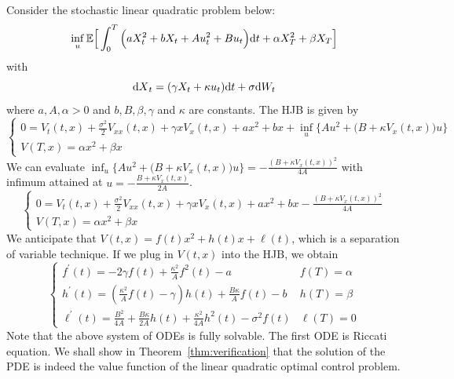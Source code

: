 \documentclass[11pt]{book}
\newcommand{\dt}{\text{\normalfont d}t}
\newcommand{\dX}{\text{\normalfont d}X}
\newcommand{\dW}{\text{\normalfont d}W}
\begin{document}
\begin{eg}\label{eg:LQ_drift}
    Consider the stochastic linear quadratic problem below:
    \begin{equation}
        \inf_u\mathbb{E}\Big[\int_0^T \Big(aX_t^2+bX_t +Au_t^2 + Bu_t\Big){\dt}+\alpha X_T^2+\beta X_T\Big]
    \end{equation}
    with
    \begin{equation}
        {\dX}_t=(\gamma X_t+\kappa u_t){\dt}+\sigma \dW_t
    \end{equation}
where $a,A, \alpha>0$ and $b,B,\beta,\gamma$ and $\kappa$ are constants. The HJB is given by 
\begin{equation}
    \begin{cases}
        0={V}_{t}(t,x) +\frac{\sigma^2}{2}V_{xx}(t,x)+ \gamma x V_{x}(t,x) + a x^2 + bx +\inf_{u}\Big\{Au^2 +\big(B+\kappa V_{x}(t,x)\big)u \Big\}\\
        V(T,x)=\alpha x^2 + \beta x
    \end{cases}
\end{equation}
We can evaluate
$\inf_u\{Au^2 +\big(B+\kappa V_{x}(t,x)\big)u\} = -\frac{(B+\kappa V_{x}(t,x))^2}{4A}$ with infimum attained at $u =-\frac{B+\kappa V_{x}(t,x)}{2A}$.
\begin{equation}
    \begin{cases}
        0={V}_{t}(t,x) +\frac{\sigma^2}{2}V_{xx}(t,x)+ \gamma x V_{x}(t,x) + a x^2 + bx -\frac{(B+\kappa V_{x}(t,x))^2}{4A}\\
        V(T,x)=\alpha x^2 + \beta x
    \end{cases}
\end{equation}
We anticipate that $V(t,x)=f(t)x^2+h(t)x+\ell(t)$, which is a separation of variable technique. If we plug in $V(t,x)$  into the HJB, we obtain
\begin{equation}
    \begin{cases}
       f^\prime(t) = -2\gamma f(t) + \frac{\kappa^2}{A}f^{2}(t) -a& f(T)=\alpha\\
       h^{\prime}(t)= (\frac{\kappa^2}{A}f(t)-\gamma)h(t)+\frac{B\kappa}{A}f(t)-b& h(T)=\beta\\
       \ell^{\prime}(t)=\frac{B^2}{4A}+\frac{B\kappa}{2A}h(t)+\frac{\kappa^2}{4A}h^2(t)-\sigma^2f(t)&\ell(T)=0
    \end{cases}
\end{equation}
Note that the above system of ODEs is fully solvable. The first ODE is Riccati equation.
We shall show in Theorem~\ref{thm:verification} that the solution of the PDE is indeed the value function of the linear quadratic optimal control problem.
\end{eg}
\end{document}
